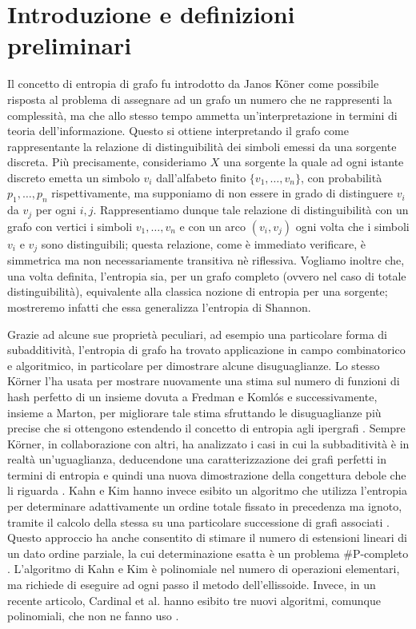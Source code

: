 \chapter{Introduzione e definizioni preliminari} Il concetto di entropia di grafo fu introdotto da Janos K\"oner come possibile risposta al problema di assegnare ad un grafo un numero che ne rappresenti la complessità, ma che allo stesso tempo ammetta un'interpretazione in termini di teoria dell'informazione. \cite{Korner1973} Questo si ottiene interpretando il grafo come rappresentante la relazione di distinguibilità dei simboli emessi da una sorgente discreta. Più precisamente, consideriamo $X$ una sorgente la quale ad ogni istante discreto emetta un simbolo $v_i$ dall'alfabeto finito $\{v_1,\dots,v_n\}$, con probabilità $p_1,\dots,p_n$ rispettivamente, ma supponiamo di non essere in grado di distinguere $v_i$ da $v_j$ per ogni $i,j$. Rappresentiamo dunque tale relazione di distinguibilità con un grafo con vertici i simboli $v_1,\dots,v_n$ e con un arco $(v_i,v_j)$ ogni volta che i simboli $v_i$ e $v_j$ sono distinguibili; questa relazione, come è immediato verificare, è simmetrica ma non necessariamente transitiva nè riflessiva. Vogliamo inoltre che, una volta definita, l'entropia sia, per un grafo completo (ovvero nel caso di totale distinguibilità), equivalente alla classica nozione di entropia per una sorgente; mostreremo infatti che essa generalizza l'entropia di Shannon.

Grazie ad alcune sue proprietà peculiari, ad esempio una particolare forma di subadditività, l'entropia di grafo ha trovato applicazione in campo combinatorico e algoritmico, in particolare per dimostrare alcune disuguaglianze. Lo stesso K\"orner l'ha usata per mostrare nuovamente una stima sul numero di funzioni di hash perfetto di un insieme dovuta a Fredman e Koml\'os \cite{Korner1986} e successivamente, insieme a Marton, per migliorare tale stima sfruttando le disuguaglianze più precise che si ottengono estendendo il concetto di entropia agli ipergrafi \cite{Korner1990}. Sempre K\"orner, in collaborazione con altri, ha analizzato i casi in cui la subbaditività è in realtà un'uguaglianza, deducendone una caratterizzazione dei grafi perfetti in termini di entropia e quindi una nuova dimostrazione della congettura debole che li riguarda \cite{Csiszar1990}. Kahn e Kim hanno invece esibito un algoritmo che utilizza l'entropia per determinare adattivamente un ordine totale fissato in precedenza ma ignoto, tramite il calcolo della stessa su una particolare successione di grafi associati \cite{Kahn1995}. Questo approccio ha anche consentito di stimare il numero di estensioni lineari di un dato ordine parziale, la cui determinazione esatta è un problema \#P-completo \cite{Brightwell1991}. L'algoritmo di Kahn e Kim \`e polinomiale nel numero di operazioni elementari, ma richiede di eseguire ad ogni passo il metodo dell'ellissoide. Invece, in un recente articolo, Cardinal et al. hanno esibito tre nuovi algoritmi, comunque polinomiali, che non ne fanno uso \cite{Cardinal2010}.

